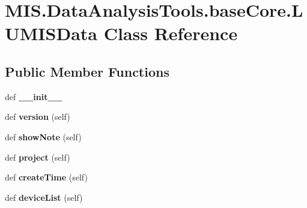 \hypertarget{classMIS_1_1DataAnalysisTools_1_1baseCore_1_1LUMISData}{}\section{M\+I\+S.\+Data\+Analysis\+Tools.\+base\+Core.\+L\+U\+M\+I\+S\+Data Class Reference}
\label{classMIS_1_1DataAnalysisTools_1_1baseCore_1_1LUMISData}
\subsection*{Public Member Functions}
\begin{DoxyCompactItemize}
\item 
\mbox{\label{classMIS_1_1DataAnalysisTools_1_1baseCore_1_1LUMISData_a89ded550713052f848157463332989ab}} 
def {\bfseries \+\_\+\+\_\+init\+\_\+\+\_\+}
\item 
\mbox{\label{classMIS_1_1DataAnalysisTools_1_1baseCore_1_1LUMISData_aeee848283aa0017863fe159396fbc726}} 
def {\bfseries version} (self)
\item 
\mbox{\label{classMIS_1_1DataAnalysisTools_1_1baseCore_1_1LUMISData_acff3ebf9158ddda1bfd98612e3f9d46b}} 
def {\bfseries show\+Note} (self)
\item 
\mbox{\label{classMIS_1_1DataAnalysisTools_1_1baseCore_1_1LUMISData_a4e22acbde6e78d03860f6bdc0507b306}} 
def {\bfseries project} (self)
\item 
\mbox{\label{classMIS_1_1DataAnalysisTools_1_1baseCore_1_1LUMISData_a68980f790044fc7918dbe3210c0643c8}} 
def {\bfseries create\+Time} (self)
\item 
\mbox{\label{classMIS_1_1DataAnalysisTools_1_1baseCore_1_1LUMISData_ac21bdf61e874198aa8e739576f48d8ff}} 
def {\bfseries device\+List} (self)
\item 
\mbox{\label{classMIS_1_1DataAnalysisTools_1_1baseCore_1_1LUMISData_afe6886f015421529d78aff86c8132298}} 

\end{DoxyCompactItemize}
